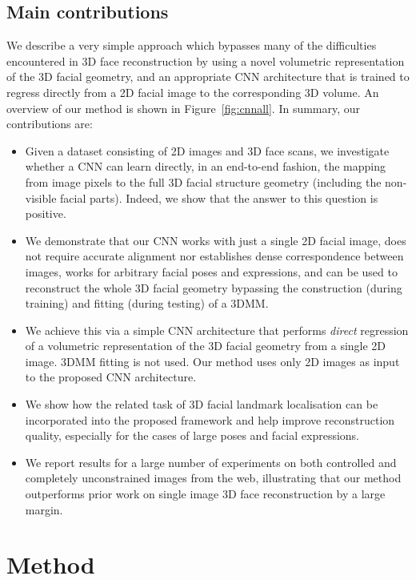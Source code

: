 \subsection{Main contributions}
We describe a very simple approach which bypasses many of the
difficulties encountered in 3D face reconstruction by using a
novel volumetric representation of the 3D facial geometry, and
an appropriate CNN architecture that is trained to regress directly
from a 2D facial image to the corresponding 3D volume. An overview of
our method is shown in Figure~\ref{fig:cnnall}. In summary, our contributions
are:
\begin{itemize}
\item Given a dataset consisting of 2D images and 3D face scans, we
  investigate whether a CNN can learn directly, in an end-to-end
  fashion, the mapping from image pixels to the full 3D facial
  structure geometry (including the non-visible facial parts). Indeed,
  we show that the answer to this question is positive.
\item We demonstrate that our CNN works with just a single 2D facial
  image, does not require accurate alignment nor establishes dense
  correspondence between images, works for arbitrary facial poses and
  expressions, and can be used to reconstruct the whole 3D facial
  geometry bypassing the construction (during training) and fitting
  (during testing) of a 3DMM.
\item We achieve this via a simple CNN architecture that performs
  \textit{direct} regression of a volumetric representation of the 3D
  facial geometry from a single 2D image. 3DMM fitting is not
  used. Our method uses only 2D images as input to the proposed CNN
  architecture.
\item We show how the related task of 3D facial landmark localisation
  can be incorporated into the proposed framework and help improve
  reconstruction quality, especially for the cases of large poses and
  facial expressions.
\item We report results for a large number of experiments on both
  controlled and completely unconstrained images from the web,
  illustrating that our method outperforms prior work on single image
  3D face reconstruction by a large margin.
\end{itemize}

\section{Method}


